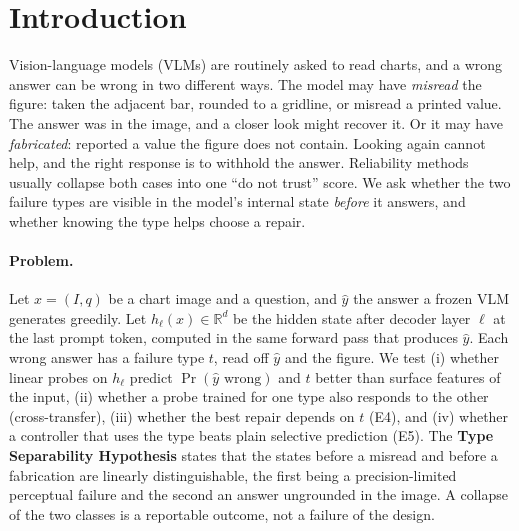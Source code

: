 \section{Introduction}
\label{sec:intro}

Vision-language models (VLMs) are routinely asked to read charts, and a wrong
answer can be wrong in two different ways. The model may have \emph{misread}
the figure: taken the adjacent bar, rounded to a gridline, or misread a printed
value. The answer was in the image, and a closer look might recover it. Or it
may have \emph{fabricated}: reported a value the figure does not contain.
Looking again cannot help, and the right response is to withhold the answer.
Reliability methods usually collapse both cases into one ``do not trust''
score. We ask whether the two failure types are visible in the model's internal
state \emph{before} it answers, and whether knowing the type helps choose a
repair.

\paragraph{Problem.} Let $x=(I,q)$ be a chart image and a question, and $\hat y$
the answer a frozen VLM generates greedily. Let $h_\ell(x)\in\mathbb{R}^d$ be the
hidden state after decoder layer $\ell$ at the last prompt token, computed in the
same forward pass that produces $\hat y$. Each wrong answer has a failure type
$t$, read off $\hat y$ and the figure. We test (i) whether linear probes on
$h_\ell$ predict $\Pr(\hat y \text{ wrong})$ and $t$ better than surface features
of the input, (ii) whether a probe trained for one type also responds to the
other (cross-transfer), (iii) whether the best repair depends on $t$ (E4), and
(iv) whether a controller that uses the type beats plain selective prediction
(E5). The \textbf{Type Separability Hypothesis} states that the states before a
misread and before a fabrication are linearly distinguishable, the first being
a precision-limited perceptual failure and the second an answer ungrounded in
the image. A collapse of the two classes is a reportable outcome, not a failure
of the design.


